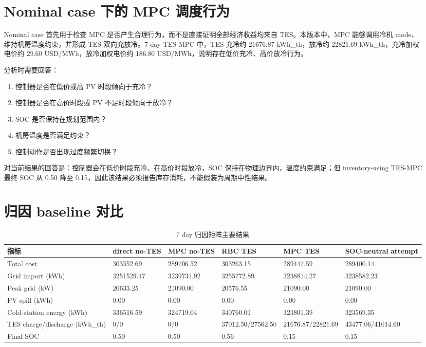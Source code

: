 \documentclass[UTF8,a4paper,12pt]{ctexrep}
\begin{document}
\section{Nominal case 下的 MPC 调度行为}

Nominal case 首先用于检查 MPC 是否产生合理行为，而不是直接证明全部经济收益均来自 TES。本版本中，MPC 能够调用冷机 mode、维持机房温度约束，并形成 TES 双向充放冷。7 day TES-MPC 中，TES 充冷约 21676.87 kWh\_th，放冷约 22821.69 kWh\_th，充冷加权电价约 29.60 USD/MWh，放冷加权电价约 186.80 USD/MWh，说明存在低价充冷、高价放冷行为。

分析时需要回答：

\begin{enumerate}[label=(\arabic*)]
  \item 控制器是否在低价或高 PV 时段倾向于充冷？
  \item 控制器是否在高价时段或 PV 不足时段倾向于放冷？
  \item SOC 是否保持在规划范围内？
  \item 机房温度是否满足约束？
  \item 控制动作是否出现过度频繁切换？
\end{enumerate}

对当前结果的回答是：控制器会在低价时段充冷、在高价时段放冷，SOC 保持在物理边界内，温度约束满足；但 inventory-using TES-MPC 最终 SOC 从 0.50 降至 0.15，因此该结果必须报告库存消耗，不能假装为周期中性结果。

\section{归因 baseline 对比}

\begin{table}[htbp]
  \centering
  \caption{7 day 归因矩阵主要结果}
  \begin{tabular}{llllll}
    \toprule
    指标 & direct no-TES & MPC no-TES & RBC TES & MPC TES & SOC-neutral attempt \\
    \midrule
    Total cost & 303552.69 & 289706.52 & 303263.15 & 289447.59 & 289400.14 \\
    Grid import (kWh) & 3251529.47 & 3239731.92 & 3255772.89 & 3238814.27 & 3238582.23 \\
    Peak grid (kW) & 20633.25 & 21090.00 & 20576.55 & 21090.00 & 21090.00 \\
    PV spill (kWh) & 0.00 & 0.00 & 0.00 & 0.00 & 0.00 \\
    Cold-station energy (kWh) & 336516.59 & 324719.04 & 340760.01 & 323801.39 & 323569.35 \\
    TES charge/discharge (kWh\_th) & 0/0 & 0/0 & 37012.50/27562.50 & 21676.87/22821.69 & 43477.06/41014.60 \\
    Final SOC & 0.50 & 0.50 & 0.56 & 0.15 & 0.15 \\
    \bottomrule
  \end{tabular}
\end{table}
\end{document}
